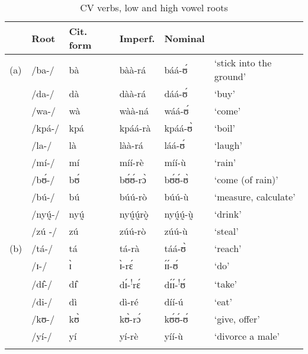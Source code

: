 \documentclass[output=paper,newtxmath,modfonts,nonflat,draftmode]{langsci/langscibook}
\begin{document}
\begin{table}
\begin{tabularx}{\textwidth}{lllllX}
\lsptoprule
& {Root} & {Cit. form} & {Imperf.} & {Nominal} & \\
\midrule
(a) & /ba-/ & bà & bàà-rá & báá-ʊ́ & ‘stick into the ground’\\
& /da-/ & dà & dàà-rá & dáá-ʊ́ & ‘buy’\\
& /wa-/ & wà & wàà-ná & wáá-ʊ́ & ‘come’\\
& /kpá-/ & kpá  & kpáá-rà  & kpáá-ʊ̀  & ‘boil’\\
& /la-/ & là  & làà-rá  & láá-ʊ́  & ‘laugh’\\
& /mí-/ & mí  & míí-rè	& míí-ù  & ‘rain’\\
& /bʊ́-/ & bʊ́ & bʊ́ʊ́-rɔ̀ &	bʊ́ʊ́-ʊ̀ & ‘come (of rain)’\\
& /bú-/ & bú & búú-rò	&	búú-ù	 & ‘measure, calculate’\\
& /nyṵ́-/ & nyṵ́ & nyṵ́ṵ́rò̰ &	nyṵ́ṵ́-ṵ̀\footnotemark[contrastive]& ‘drink’\\
& /zú{} -/ & z\'u{}  & zúú-rò &	zúú-ù & ‘steal’\\
\tablevspace
(b) & /tá-/ & tá & tá-rà &	táá-ʊ̀ & ‘reach’\\
& /ɪ-/ & ɪ̀ & ɪ̀-rɛ́ &	ɪ́ɪ́-ʊ́ & ‘do’\\
& /dɪ̂-/ & dɪ̂ & dɪ́-\textsuperscript{!}rɛ́ & dɪ́ɪ́-\textsuperscript{!}ʊ́  & ‘take’\\
& /di-/ & dì & dì-ré & díí-ú & ‘eat’\\
& /kʊ-/ & kʊ̀ & kʊ̀-rɔ́ &	kʊ́ʊ́-ʊ́ & ‘give, offer’\\
& /yí-/ & yí{}  & yí-rè &	yíí-ù  & ‘divorce a male’\\
\lspbottomrule
\end{tabularx} 
\caption{CV verbs, low and high vowel roots}
\label{tab:anttila:6}
\end{table}

\end{document}
